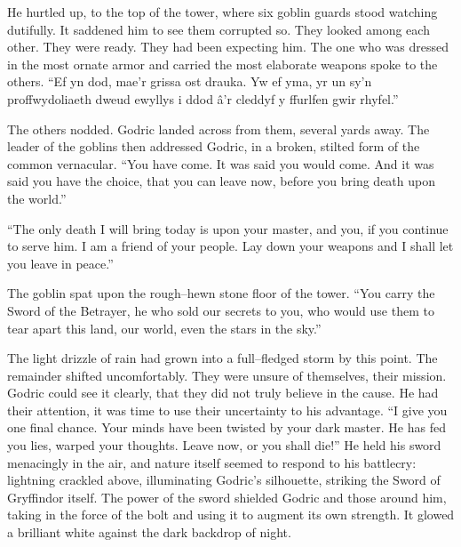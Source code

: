 \SmallVSpace
He hurtled up, to the top of the tower, where six goblin guards stood watching dutifully. It saddened him to see them corrupted so. They looked among each other. They were ready. They had been expecting him. The one who was dressed in the most ornate armor and carried the most elaborate weapons spoke to the others.
\SomeVSpace
“Ef yn dod, mae’r grissa ost drauka. Yw ef yma, yr un sy’n proffwydoliaeth dweud ewyllys i ddod â’r cleddyf y ffurlfen gwir rhyfel.”

The others nodded. Godric landed across from them, several yards away. The leader of the goblins then addressed Godric, in a broken, stilted form of the common vernacular. “You have come. It was said you would come. And it was said you have the choice, that you can leave now, before you bring death upon the world.”

“The only death I will bring today is upon your master, and you, if you continue to serve him. I am a friend of your people. Lay down your weapons and I shall let you leave in peace.”

The goblin spat upon the rough\mbox{--}hewn stone floor of the tower. “You carry the Sword of the Betrayer, he who sold our secrets to you, who would use them to tear apart this land, our world, even the stars in the sky.”

The light drizzle of rain had grown into a full\mbox{--}fledged storm by this point. The remainder shifted uncomfortably. They were unsure of themselves, their mission. Godric could see it clearly, that they did not truly believe in the cause. He had their attention, it was time to use their uncertainty to his advantage.
\SmallVSpace
“I give you one final chance. Your minds have been twisted by your dark master. He has fed you lies, warped your thoughts. Leave now, or you shall die!”
\SmallVSpace
He held his sword menacingly in the air, and nature itself seemed to respond to his battlecry: lightning crackled above, illuminating Godric’s silhouette, striking the Sword of Gryffindor itself. The power of the sword shielded Godric and those around him, taking in the force of the bolt and using it to augment its own strength. It glowed a brilliant white against the dark backdrop of night.

